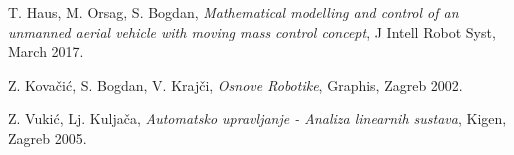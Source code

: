 \documentclass[11pt,a4paper]{article}
\begin{document}
\begin{thebibliography}{9}
  T. Haus, M. Orsag, S. Bogdan,
  \emph{Mathematical modelling and control of an unmanned aerial vehicle with moving mass control concept},
  J Intell Robot Syst,
  March 2017. 
  
  Z. Kovačić, S. Bogdan, V. Krajči,
  \emph{Osnove Robotike},
  Graphis,
  Zagreb 2002.
 
  Z. Vukić, Lj. Kuljača,
  \emph{Automatsko upravljanje - Analiza linearnih sustava},
  Kigen,
  Zagreb 2005.
  

  
  
\end{thebibliography}
\end{document}
